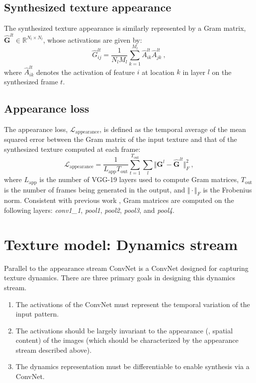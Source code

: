 \subsection{Synthesized texture appearance}

The synthesized texture appearance is similarly represented by a
Gram matrix, $\hat{\mathbf{G}}^{lt} \in \mathbb{R}^{N_l \times N_l}$,
whose activations are given by:
\begin{equation}
	\hat{G}_{ij}^{lt} = \frac{1}{N_l M_l} \sum_{k=1}^{M_l} \hat{A}_{ik}^{lt} \hat{A}_{jk}^{lt}\ ,
	\label{eq:gram_synthesized}	
\end{equation}
where $\hat{A}_{ik}^{lt}$ denotes the activation of feature $i$ at
location $k$ in layer $l$ on the synthesized frame $t$.

\subsection{Appearance loss}

The appearance loss, $\mathcal{L}_\text{appearance}$, is defined as the temporal average of the mean squared error between
the Gram matrix of the input texture and that of the synthesized
texture computed at each frame:
\begin{equation}
   \mathcal{L}_\text{appearance} = \frac{1}{L_\text{app} T_\text{out}} \sum_{t=1}^{T_\text{out}} \sum_{l} \Vert \mathbf{G}^l - \hat{\mathbf{G}}^{lt} \Vert^2_F\ ,
   \label{eq:apploss}
\end{equation}
where $L_\text{app}$ is the number of VGG-19 layers used to compute Gram
matrices, $T_\text{out}$ is the number of frames being generated in
the output, and $\Vert \cdot \Vert_F$ is the Frobenius norm.
Consistent with previous work \cite{gatys2015}, Gram matrices are computed on the
following layers: 
\emph{conv1\_1}, \emph{pool1}, \emph{pool2}, \emph{pool3}, and \emph{pool4}.

\section{Texture model: Dynamics stream}

Parallel to the appearance stream ConvNet is a ConvNet designed for capturing texture dynamics. There are three primary goals in designing this dynamics stream.
\begin{enumerate}
	\item The activations of the ConvNet must represent the temporal variation of the input pattern.
	\item The activations should be largely invariant to the appearance (\ie, spatial content) of the images (which should be characterized by the appearance stream described above).
	\item The dynamics representation must be differentiable to enable synthesis via a ConvNet.
\end{enumerate}

